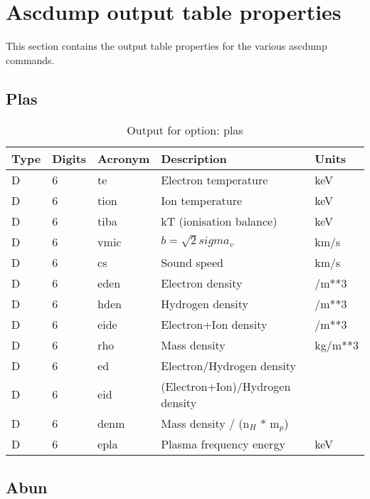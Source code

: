 \section{Ascdump output table properties}

This section contains the output table properties for the various ascdump commands.

\subsection{Plas}

\begin{table}[!p]
\caption{Output for option: plas}
\label{tabout:plas}
\begin{tabular}{lllll}
\hline
Type & Digits & Acronym & Description & Units \\ 
\hline
D &  6 & te   & Electron temperature             & keV              \\
D &  6 & tion & Ion temperature                  & keV              \\
D &  6 & tiba & kT (ionisation balance)          & keV              \\
D &  6 & vmic & $b = \sqrt{2} sigma_v$           & km/s             \\
D &  6 & cs   & Sound speed                      & km/s             \\
D &  6 & eden & Electron density                 & /m**3            \\
D &  6 & hden & Hydrogen density                 & /m**3            \\
D &  6 & eide & Electron+Ion density             & /m**3            \\
D &  6 & rho  & Mass density                     & kg/m**3          \\
D &  6 & ed   & Electron/Hydrogen density        &                  \\
D &  6 & eid  & (Electron+Ion)/Hydrogen density  &                  \\
D &  6 & denm & Mass density / ($\mathrm{n}_H$ * $\mathrm{m}_p$)   &                  \\
D &  6 & epla & Plasma frequency energy          & keV              \\
\hline
\end{tabular}
\end{table}

\subsection{Abun}

